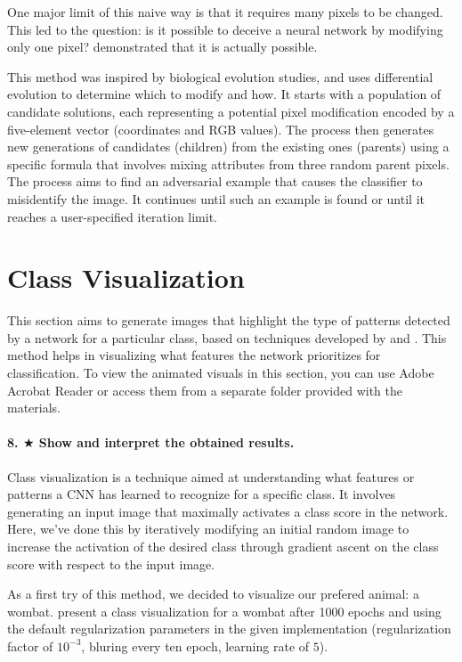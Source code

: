 One major limit of this naive way is that it requires many pixels to be changed. This led to the question: is it possible to deceive a neural network by modifying only one pixel? \cite{Su_2019} demonstrated that it is actually possible.

This method was inspired by biological evolution studies, and uses differential evolution to determine which to modify and how. It starts with a population of candidate solutions, each representing a potential pixel modification encoded by a five-element vector (coordinates and RGB values). The process then generates new generations of candidates (children) from the existing ones (parents) using a specific formula that involves mixing attributes from three random parent pixels. The process aims to find an adversarial example that causes the classifier to misidentify the image. It continues until such an example is found or until it reaches a user-specified iteration limit.

\section{Class Visualization}

This section aims to generate images that highlight the type of patterns detected by a network for a particular class, based on techniques developed by \cite{simonyan2014deep} and \cite{yosinski2015understanding}. This method helps in visualizing what features the network prioritizes for classification. To view the animated visuals in this section, you can use Adobe Acrobat Reader or access them from a separate folder provided with the materials.

\paragraph*{8. $ \bigstar $ Show and interpret the obtained results.}
Class visualization is a technique aimed at understanding what features or patterns a CNN has learned to recognize for a specific class. It involves generating an input image that maximally activates a class score in the network. Here, we've done this by iteratively modifying an initial random image to increase the activation of the desired class through gradient ascent on the class score with respect to the input image.

As a first try of this method, we decided to visualize our prefered animal: a wombat.  present a class visualization for a wombat after 1000 epochs and using the default regularization parameters in the given implementation (regularization factor of $10^{-3}$, bluring every ten epoch, learning rate of $5$). 

